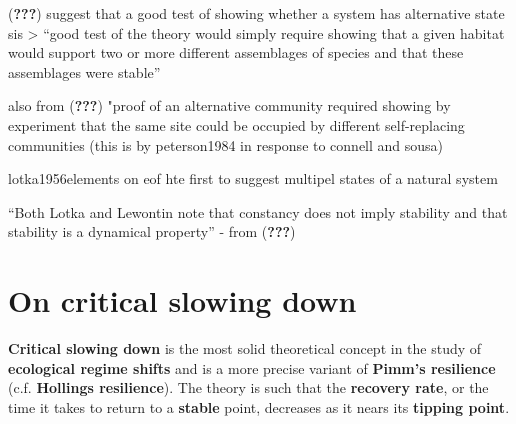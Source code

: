 \documentclass[12pt,twoside,openany]{reedthesis}
\begin{document}
({\textbf{???}}) suggest that a good test of showing whether a system has alternative state sis
\textgreater{} ``good test of the theory would simply require showing that a given habitat would support two or more different assemblages of species and that these assemblages were stable''

also from ({\textbf{???}}) "proof of an alternative community required showing by
experiment that the same site could be occupied by different self-replacing communities (this is by peterson1984 in response to connell and sousa)

lotka1956elements on eof hte first to suggest multipel states of a natural system

``Both Lotka and Lewontin note that constancy does not imply stability and that stability is a
dynamical property'' - from ({\textbf{???}})

\hypertarget{on-critical-slowing-down}{%
\section{On critical slowing down}\label{on-critical-slowing-down}}

\textbf{Critical slowing down} is the most solid theoretical concept in the study of \textbf{ecological regime shifts} and is a more precise variant of \textbf{Pimm's resilience} (c.f. \textbf{Hollings resilience}). The theory is such that the \textbf{recovery rate}, or the time it takes to return to a \textbf{stable} point, decreases as it nears its \textbf{tipping point}.
\end{document}
